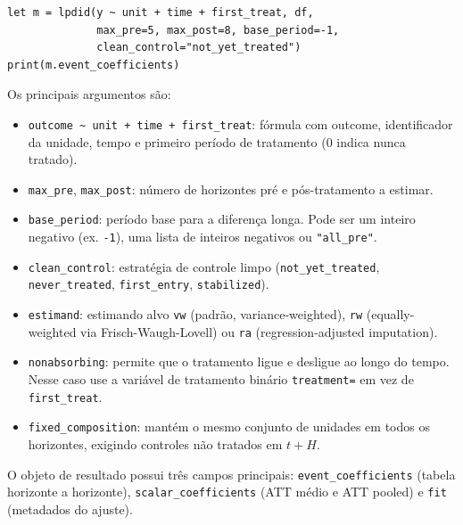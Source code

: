 \begin{lstlisting}[caption={LP-DiD com adoção escalonada absorvente}]
let m = lpdid(y ~ unit + time + first_treat, df,
              max_pre=5, max_post=8, base_period=-1,
              clean_control="not_yet_treated")
print(m.event_coefficients)
\end{lstlisting}

Os principais argumentos são:

\begin{itemize}
  \item \texttt{outcome \textasciitilde\ unit + time + first\_treat}:
    fórmula com outcome, identificador da unidade, tempo e primeiro
    período de tratamento (0 indica nunca tratado).
  \item \texttt{max\_pre}, \texttt{max\_post}: número de horizontes
    pré e pós-tratamento a estimar.
  \item \texttt{base\_period}: período base para a diferença longa.
    Pode ser um inteiro negativo (ex. \texttt{-1}), uma lista de
    inteiros negativos ou \texttt{"all\_pre"}.
  \item \texttt{clean\_control}: estratégia de controle limpo
    (\texttt{not\_yet\_treated}, \texttt{never\_treated},
    \texttt{first\_entry}, \texttt{stabilized}).
  \item \texttt{estimand}: estimando alvo \texttt{vw} (padrão,
    variance-weighted), \texttt{rw} (equally-weighted via
    Frisch-Waugh-Lovell) ou \texttt{ra} (regression-adjusted
    imputation).
  \item \texttt{nonabsorbing}: permite que o tratamento ligue e
    desligue ao longo do tempo. Nesse caso use a variável de
    tratamento binário \texttt{treatment=} em vez de
    \texttt{first\_treat}.
  \item \texttt{fixed\_composition}: mantém o mesmo conjunto de
    unidades em todos os horizontes, exigindo controles não tratados
    em $t+H$.
\end{itemize}

O objeto de resultado possui três campos principais:
\texttt{event\_coefficients} (tabela horizonte a horizonte),
\texttt{scalar\_coefficients} (ATT médio e ATT pooled) e
\texttt{fit} (metadados do ajuste).
